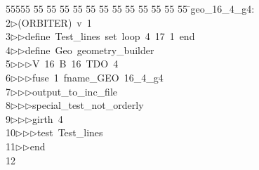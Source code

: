 %
%
\begin{tabbing}
55555 \= 55 \= 55 \= 55 \= 55 \= 55 \= 55 \= 55 \= 55 \= 55 \= 55 \= 55 \= 55 \= \>geo\_16\_4\_g4:\\[0pt]
2\>$\triangleright$\>(ORBITER)\ v\ 1\ \\[0pt]
3\>$\triangleright$\>$\triangleright$\>define\ Test\_lines\ set\ loop\ 4\ 17\ 1\ end\ \\[0pt]
4\>$\triangleright$\>$\triangleright$\>define\ Geo\ geometry\_builder\ \\[0pt]
5\>$\triangleright$\>$\triangleright$\>$\triangleright$\>V\ 16\ B\ 16\ TDO\ 4\ \\[0pt]
6\>$\triangleright$\>$\triangleright$\>$\triangleright$\>fuse\ 1\ fname\_GEO\ 16\_4\_g4\ \\[0pt]
7\>$\triangleright$\>$\triangleright$\>$\triangleright$\>output\_to\_inc\_file\ \\[0pt]
8\>$\triangleright$\>$\triangleright$\>$\triangleright$\>special\_test\_not\_orderly\ \\[0pt]
9\>$\triangleright$\>$\triangleright$\>$\triangleright$\>girth\ 4\ \\[0pt]
10\>$\triangleright$\>$\triangleright$\>$\triangleright$\>test\ Test\_lines\ \\[0pt]
11\>$\triangleright$\>$\triangleright$\>end\\[0pt]
12\>\end{tabbing}
